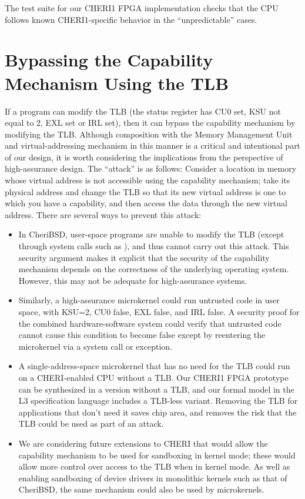 The test suite for our CHERI1 FPGA implementation checks that the CPU follows
known CHERI1-specific behavior in the ``unpredictable'' cases.

\section{Bypassing the Capability Mechanism Using the TLB}

If a program can modify the TLB (the status register has CU0 set, KSU not
equal to 2, EXL set or IRL set), then it can bypass the capability mechanism
by modifying the TLB. Although composition with the Memory Management Unit and
virtual-addressing mechanism in this manner is a critical and intentional part
of our design, it is worth considering the implications from the perspective
of high-assurance design.
The ``attack'' is as follows: Consider a location in memory
whose virtual address is not accessible using the capability mechanism; take
its physical address and change the TLB so that its new virtual address is one
to which you have a capability, and then access the data through the new virtual
address. There are several ways to prevent this attack:

\begin{itemize}
\item
In CheriBSD, user-space programs are unable to modify the TLB (except through
system calls such as ), and thus cannot carry out this attack.
This  security argument makes it explicit that the security of the capability
mechanism depends on the correctness of the underlying operating system. 
However, this may not be adequate for high-assurance systems.
\item
Similarly, a high-assurance microkernel could run untrusted code in user
space, with KSU=2, CU0 false, EXL false, and IRL false. A security proof
for the combined hardware-software system could verify that untrusted code
cannot cause this condition to become false except by reentering the microkernel
via a system call or exception.
\item
A single-address-space microkernel that has no need for the TLB could run on
a CHERI-enabled CPU without a TLB. Our CHERI1 FPGA prototype can be
synthesized in a version without a TLB, and our formal model in the L3
specification language includes a TLB-less variant. Removing the TLB for
applications that don't need it saves chip area, and removes the risk that the
TLB could be used as part of an attack.
\item
We are considering future extensions to CHERI that would allow the capability
mechanism to be used for sandboxing in kernel mode; these would allow more control
over access to the TLB when in kernel mode. As well as enabling sandboxing of
device drivers in monolithic kernels such as that of CheriBSD, the same mechanism
could also be used by microkernels.
\end{itemize}

